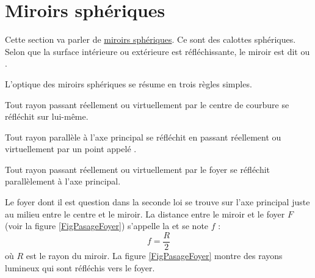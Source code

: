 

\section{Miroirs sphériques}
Cette section va parler de \href{http://fr.wikipedia.org/wiki/Miroir_sphérique}{miroirs sphériques}. Ce sont des calottes sphériques. Selon que la surface intérieure ou extérieure est réfléchissante, le miroir est dit  ou .

L'optique des miroirs sphériques se résume en trois règles simples.
\setcounter{numloiphyz}{0}		%
\begin{loiphyz}\label{PgLoiMirSph}
Tout rayon passant réellement ou virtuellement par le centre de courbure se réfléchit sur lui-même.
\end{loiphyz}

\begin{loiphyz}
Tout rayon parallèle à l'axe principal se réfléchit en passant réellement ou virtuellement par un point appelé .
\end{loiphyz}

\begin{loiphyz}
Tout rayon passant réellement ou virtuellement par le foyer se réfléchit parallèlement à l'axe principal.
\end{loiphyz}
Le foyer dont il est question dans la seconde loi se trouve sur l'axe principal juste au milieu entre le centre et le miroir. La distance entre le miroir et le foyer $F$ (voir la figure \ref{FigPasageFoyer}) s'appelle la  et se note $f$ :
\begin{equation}
  f=\frac{ R }{ 2 }
\end{equation}
où $R$ est le rayon du miroir. La figure \ref{FigPasageFoyer} montre des rayons lumineux qui sont réfléchis vers le foyer.


\newcommand{\PreFigPassagefoyer}{%
\pstGeonode(0,0){C}(-3,0){Pm}(1.5,0.5){A}(1.5,-0.5){B}
\pstTranslation{Pm}{C}{C}[Pml]
\pstMiroirSph{C}{Pm}{A}{F}{AmP}{AmPl}{AmC}{AmCl}{iA}
\pstTraceMiroirSph{C}{Pm}{F}{55}{S1}{S2}

\pstMiroirSph{C}{Pm}{B}{F}{BmP}{BmPl}{BmC}{BmCl}{iB}
}

